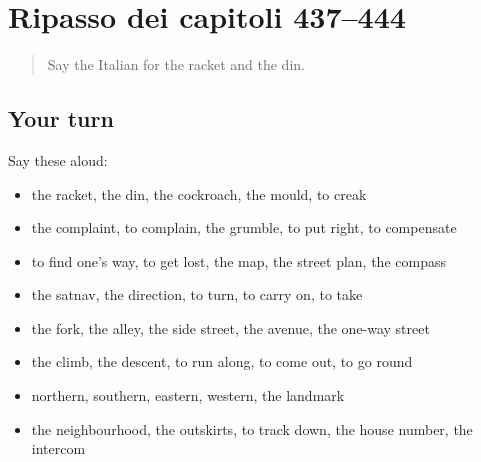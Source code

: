 \section[(dialogue)]{Ripasso dei capitoli 437–444}

\label{lesson:IT-R444-ripasso-437-444}



\begin{quote}
Say the Italian for the racket and the din.
\end{quote}

\subsection*{Your turn}
Say these aloud:

\begin{itemize}
\raggedright
  \item the racket, the din, the cockroach, the mould, to creak
  \item the complaint, to complain, the grumble, to put right, to compensate
  \item to find one's way, to get lost, the map, the street plan, the compass
  \item the satnav, the direction, to turn, to carry on, to take
  \item the fork, the alley, the side street, the avenue, the one-way street
  \item the climb, the descent, to run along, to come out, to go round
  \item northern, southern, eastern, western, the landmark
  \item the neighbourhood, the outskirts, to track down, the house number, the intercom
\end{itemize}

